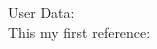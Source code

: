 \documentclass[a4paper, 11pt, ]{article}
\begin{document}
User Data: \cite{dataSource}\\
This my first reference: \cite{Emerson2001-gz}





\end{document}
